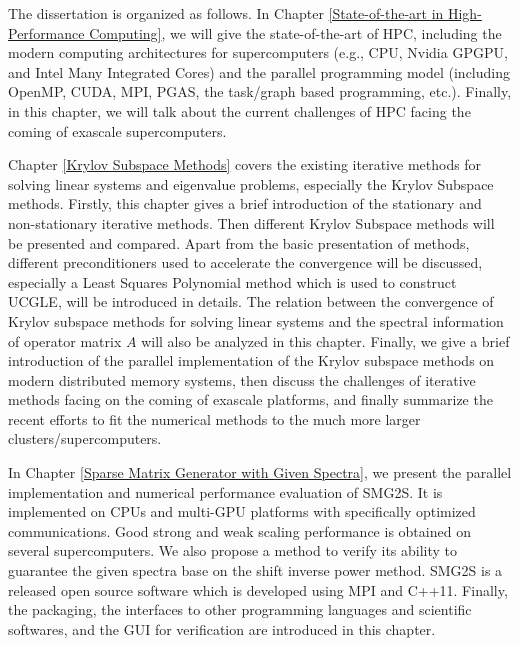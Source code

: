 The dissertation is organized as follows. In Chapter \ref{State-of-the-art in High-Performance Computing}, we will give the state-of-the-art of HPC, including the modern computing architectures for supercomputers (e.g., CPU, Nvidia GPGPU, and Intel Many Integrated Cores) and the parallel programming model (including OpenMP, CUDA, MPI, PGAS, the task/graph based programming, etc.). Finally, in this chapter, we will talk about the current challenges of HPC facing the coming of exascale supercomputers.

Chapter \ref{Krylov Subspace Methods} covers the existing iterative methods for solving linear systems and eigenvalue problems, especially the Krylov Subspace methods. Firstly, this chapter gives a brief introduction of the stationary and non-stationary iterative methods. Then different Krylov Subspace methods will be presented and compared. Apart from the basic presentation of methods, different preconditioners used to accelerate the convergence will be discussed, especially a Least Squares Polynomial method which is used to construct UCGLE, will be introduced in details. The relation between the convergence of Krylov subspace methods for solving linear systems and the spectral information of operator matrix $A$ will also be analyzed in this chapter. Finally, we give a brief introduction of the parallel implementation of the Krylov subspace methods on modern distributed memory systems, then discuss the challenges of iterative methods facing on the coming of exascale platforms, and finally summarize the recent efforts to fit the numerical methods to the much more larger clusters/supercomputers.


In Chapter \ref{Sparse Matrix Generator with Given Spectra}, we present the parallel implementation and numerical performance evaluation of SMG2S. It is implemented on CPUs and multi-GPU platforms with specifically optimized communications. Good strong and weak scaling performance is obtained on several supercomputers. We also propose a method to verify its ability to guarantee the given spectra base on the shift inverse power method. SMG2S is a released open source software which is developed using MPI and C++11. Finally, the packaging, the interfaces to other programming languages and scientific softwares, and the GUI for verification are introduced in this chapter.

